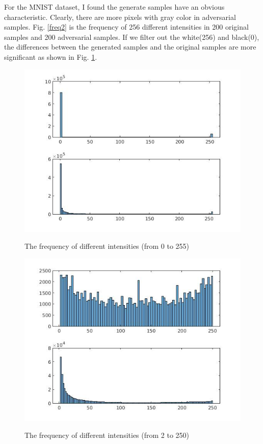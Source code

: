 \documentclass[a4paper]{article}
\begin{document}
For the MNIST dataset, I found the generate samples have an obvious characteristic. Clearly, there are more pixels with gray color in adversarial samples. Fig. \ref{freq2} is the frequency of 256 different intensities in 200 original samples and 200 adversarial samples. If we filter out the white(256) and black(0), the differences between the generated samples and the original samples are more significant as shown in Fig. \ref{freq}.
\begin{figure}
\centering
\begin{minipage}[t]{0.45\textwidth}
\centering
\includegraphics[scale=0.3]{freq2.jpg}
\label{freq2}
\caption{The frequency of different intensities (from 0 to 255)}
\end{minipage}
\begin{minipage}[t]{0.45\textwidth}
\centering
\includegraphics[scale=0.3]{freq.jpg}
\label{freq}
\caption{The frequency of different intensities (from 2 to 250)}
\end{minipage}
\end{figure}
\end{document}
